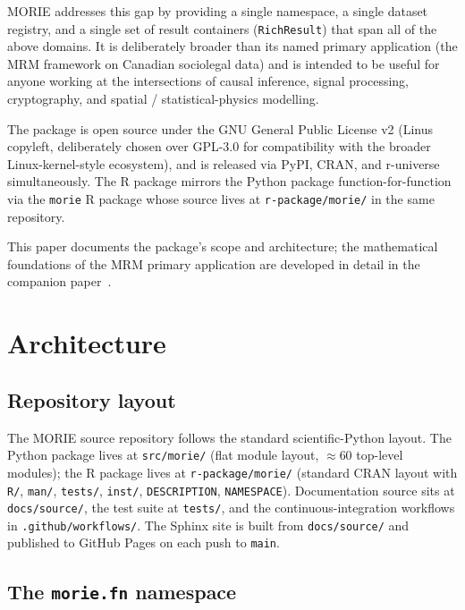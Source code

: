 \documentclass[11pt,a4paper]{article}
\theoremstyle{plain}
\theoremstyle{definition}
\theoremstyle{remark}
\begin{document}
MORIE addresses this gap by providing a single namespace, a
single dataset registry, and a single set of result containers
(\texttt{RichResult}) that span all of the above domains. It is
deliberately broader than its named primary application (the MRM
framework on Canadian sociolegal data) and is intended to be
useful for anyone working at the intersections of causal
inference, signal processing, cryptography, and spatial /
statistical-physics modelling.

The package is open source under the GNU General Public License
v2 (Linus copyleft, deliberately chosen over GPL-3.0 for
compatibility with the broader Linux-kernel-style ecosystem), and
is released via PyPI, CRAN, and r-universe simultaneously. The R
package mirrors the Python package function-for-function via the
\texttt{morie} R package whose source lives at
\texttt{r-package/morie/} in the same repository.

This paper documents the package's scope and architecture; the
mathematical foundations of the MRM primary application are
developed in detail in the companion paper~\cite{Ruhela2026MRM}.

\section{Architecture}
\label{sec:architecture}

\subsection{Repository layout}

The MORIE source repository follows the standard scientific-Python
layout. The Python package lives at \texttt{src/morie/} (flat
module layout, $\approx 60$ top-level modules); the R package
lives at \texttt{r-package/morie/} (standard CRAN layout with
\texttt{R/}, \texttt{man/}, \texttt{tests/}, \texttt{inst/},
\texttt{DESCRIPTION}, \texttt{NAMESPACE}). Documentation source
sits at \texttt{docs/source/}, the test suite at
\texttt{tests/}, and the continuous-integration workflows in
\texttt{.github/workflows/}. The Sphinx site is built from
\texttt{docs/source/} and published to GitHub Pages on each push
to \texttt{main}.

\subsection{The \texttt{morie.fn} namespace}
\end{document}
